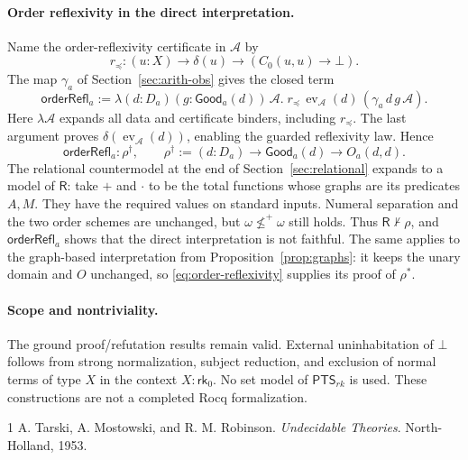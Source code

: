 \documentclass[11pt,a4paper]{article}
\newcommand{\rk}[1]{\mathsf{rk}_{#1}}
\newcommand{\PTS}{\mathsf{PTS}_{rk}}
\newcommand{\R}{\mathsf R}
\newcommand{\ev}{\operatorname{ev}}
\newcommand{\Da}{D_{\!a}}
\newcommand{\Oa}{O_a}
\newcommand{\Gooda}{\mathsf{Good}_a}
\theoremstyle{remark}\newtheorem*{remark}{Remark}
\begin{document}
\paragraph{Order reflexivity in the direct interpretation.}
Name the order-reflexivity certificate in $\mathcal A$ by
\[
 r_{\preceq}:(u:X)\to\delta(u)\to(C_0(u,u)\to\bot).
\]
The map $\gamma_a$ of Section~\ref{sec:arith-obs} gives the closed term
\[
 \mathsf{orderRefl}_a:=
 \lambda(d:\Da)(g:\Gooda(d))\,\mathcal A.\;
 r_{\preceq}\,\ev_{\mathcal A}(d)\,
               (\gamma_a\,d\,g\,\mathcal A).
\]
Here $\lambda\mathcal A$ expands all data and certificate binders,
including $r_{\preceq}$. The last argument proves
$\delta(\ev_{\mathcal A}(d))$, enabling the guarded reflexivity law. Hence
\[
 \mathsf{orderRefl}_a:\rho^\dagger,
 \qquad \rho^\dagger:=(d:\Da)\to\Gooda(d)\to\Oa(d,d).
\]
The relational countermodel at the end of Section~\ref{sec:relational}
expands to a model of $\R$: take $+$ and $\cdot$ to be the total functions
whose graphs are its predicates $A,M$. They have the required values on
standard inputs. Numeral separation and the two order schemes are unchanged,
but $\omega\not\le^+\omega$ still holds. Thus $\R\nvdash\rho$, and
$\mathsf{orderRefl}_a$ shows that the direct interpretation is not faithful.
The same applies to the graph-based interpretation from
Proposition~\ref{prop:graphs}: it keeps the unary domain and $O$ unchanged,
so \eqref{eq:order-reflexivity} supplies its proof of $\rho^*$.

\paragraph{Scope and nontriviality.}
The ground proof/refutation results remain valid. External uninhabitation of
$\bot$ follows from strong normalization, subject reduction, and exclusion of
normal terms of type $X$ in the context $X:\rk0$. No set model of $\PTS$
is used. These constructions are not a completed Rocq formalization.

\begin{thebibliography}{1}\small
{}
A. Tarski, A. Mostowski, and R. M. Robinson.
\emph{Undecidable Theories}. North-Holland, 1953.
\end{thebibliography}
\end{document}

